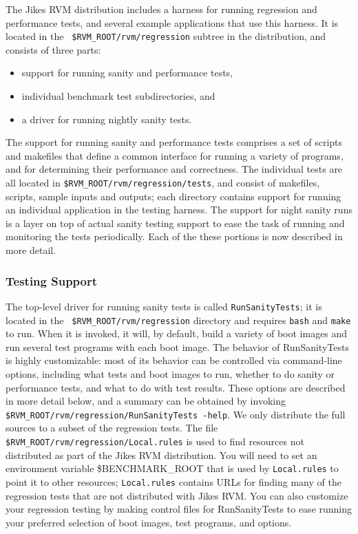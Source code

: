  The Jikes\TMweb{} RVM distribution includes a harness for running
regression and performance tests, and several example applications
that use this harness.  It is located in the {\tt
\$RVM\_\-ROOT/rvm/regression} subtree in the distribution, and consists
of three parts:
\begin{itemize}
\item support for running sanity and performance tests, 
\item individual benchmark test subdirectories, and 
\item a driver for running nightly sanity tests.  
\end{itemize}
The support for running
sanity and performance tests comprises a set of scripts and makefiles
that define a common interface for running a variety of programs, and
for determining their performance and correctness.  The individual
tests are all located in {\tt{\$RVM\_\-ROOT/rvm/regression/tests}}, and
consist of makefiles, scripts, sample inputs and outputs; each
directory contains support for running an individual application in
the testing harness.  The support for night sanity runs is a layer on
top of actual sanity testing support to ease the task of running and
monitoring the tests periodically.  Each of the these portions is now
described in more detail.

\subsubsection{Testing Support}

The top-level driver for running sanity tests is called
{\tt{RunSanityTests}}; it is located in the {\tt
\$RVM\_\-ROOT/rvm/regression} directory 
and requires {\tt{bash}} and {{\tt make}} to run.  When it
is invoked, it will, by default, build a variety of boot images and
run several test programs with each boot image.  The behavior of
RunSanityTests is highly customizable: most of its behavior can be
controlled via command-line options, including what tests and boot
images to run, whether to do sanity or performance tests, and what to
do with test results. These options are described in more detail
below, and a summary can be obtained by invoking {\tt
\$RVM\_\-ROOT/rvm/regression/RunSanityTests -help}. 
We only distribute the full sources to a subset of the regression
tests. The file {\tt \$RVM\_\-ROOT/rvm/regression/Local.rules} is used
to find resources not distributed as part of the Jikes RVM
distribution.  You will need to set an environment variable 
\$BENCHMARK\_\-ROOT that is used by {\tt Local.rules} to point it to
other resources; {\tt Local.rules} contains URLs for finding many of
the regression tests that are not distributed with Jikes RVM.
You can also customize your regression testing by making control files
for RunSanityTests to ease running your preferred selection of boot
images, test programs, and options. 

